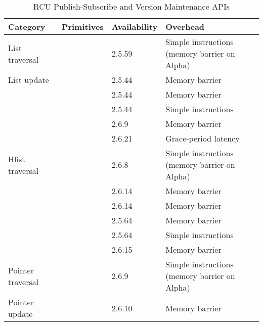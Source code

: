 \begin{table*}[tb]
\footnotesize
\centering\tymin=1.0in\tymax=1.6in
\begin{tabulary}{5in}{l|L|l|L}
Category &
	Primitives &
		Availability &
			Overhead \\
\hline
\hline
List traversal &
	 &
		2.5.59 &
			{ \raggedright
			  Simple instructions (memory barrier on Alpha) } \\
\hline
List update &
	 &
		2.5.44 &
			Memory barrier \\
&
	 &
		2.5.44 &
			Memory barrier \\
&
	 &
		2.5.44 &
			Simple instructions \\
&
	 &
		2.6.9 &
			Memory barrier \\
&
	 &
		2.6.21 &
			Grace-period latency \\
\hline
Hlist traversal &
	 &
		2.6.8 &
			{ \raggedright
			  Simple instructions (memory barrier on Alpha) } \\
&
	 &
		2.6.14 &
			Memory barrier \\
&
	 &
		2.6.14 &
			Memory barrier \\
&
	 &
		2.5.64 &
			Memory barrier \\
&
	 &
		2.5.64 &
			Simple instructions \\
&
	 &
		2.6.15 &
			Memory barrier \\
\hline
Pointer traversal &
	 &
		2.6.9 &
			{ \raggedright
			  Simple instructions (memory barrier on Alpha) } \\
\hline
Pointer update &
	 &
		2.6.10 &
			Memory barrier \\
\end{tabulary}
\caption{RCU Publish-Subscribe and Version Maintenance APIs}
\label{tab:defer:RCU Publish-Subscribe and Version Maintenance APIs}
\end{table*}

